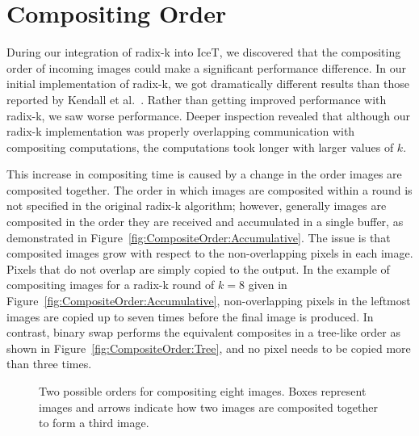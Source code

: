 \documentclass{vgtc}                          %
\newcommand*{\scite}[1]{~\cite{#1}}
\newcommand{\etal}{et al.}
\begin{document}
\section{Compositing Order}
\label{sec:CompositingOrder}

During our integration of radix-k into IceT, we discovered that the
compositing order of incoming images could make a significant performance
difference.  In our initial implementation of radix-k, we got dramatically
different results than those reported by Kendall \etal\scite{Kendall2010}.
Rather than getting improved performance with radix-k, we saw worse
performance.  Deeper inspection revealed that although our radix-k
implementation was properly overlapping communication with compositing
computations, the computations took longer with larger values of $k$.

This increase in compositing time is caused by a change in the order images
are composited together.  The order in which images are composited within a
round is not specified in the original radix-k algorithm; however,
generally images are composited in the order they are received and
accumulated in a single buffer, as demonstrated in
Figure~\ref{fig:CompositeOrder:Accumulative}.  The issue is that composited
images grow with respect to the non-overlapping pixels in each image.
Pixels that do not overlap are simply copied to the output.  In the example
of compositing images for a radix-k round of $k=8$ given in
Figure~\ref{fig:CompositeOrder:Accumulative}, non-overlapping pixels in the
leftmost images are copied up to seven times before the final image is
produced.  In contrast, binary swap performs the equivalent composites in a
tree-like order as shown in Figure~\ref{fig:CompositeOrder:Tree}, and no
pixel needs to be copied more than three times.

\begin{figure}[htbp]
  \centering
  \quad
  \caption{Two possible orders for compositing eight images.  Boxes
    represent images and arrows indicate how two images are composited
    together to form a third image.}
  \label{fig:CompositeOrder}
\end{figure}
\end{document}
